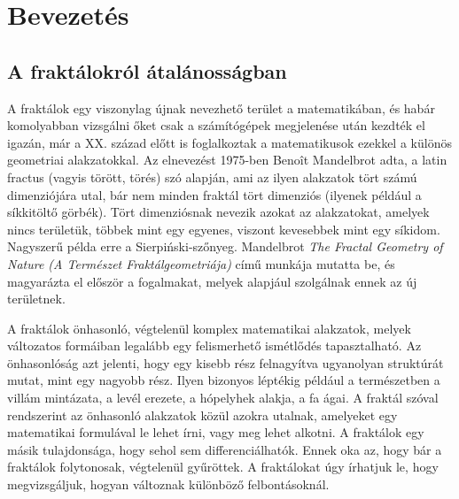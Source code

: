 \chapter*{Bevezetés}
\section*{A fraktálokról átalánosságban}
A fraktálok egy viszonylag újnak nevezhető terület a matematikában, és habár komolyabban vizsgálni őket csak a számítógépek megjelenése után kezdték el igazán, már a XX. század előtt is foglalkoztak a matematikusok ezekkel a különös geometriai alakzatokkal. Az elnevezést 1975-ben Benoît Mandelbrot adta, a latin fractus (vagyis törött, törés) szó alapján, ami az ilyen alakzatok tört számú dimenziójára utal, bár nem minden fraktál tört dimenziós (ilyenek például a síkkitöltő görbék).
Tört dimenziósnak nevezik azokat az alakzatokat, amelyek nincs területük, többek mint egy egyenes, viszont kevesebbek mint egy síkidom. Nagyszerű példa erre a Sierpiński-szőnyeg. Mandelbrot {\it The Fractal Geometry of Nature (A Természet Fraktálgeometriája)} című munkája mutatta be, és magyarázta el először a fogalmakat, melyek alapjául szolgálnak ennek az új területnek.
\par A fraktálok önhasonló, végtelenül komplex matematikai alakzatok, melyek változatos formáiban legalább egy felismerhető ismétlődés tapasztalható. Az önhasonlóság azt jelenti, hogy egy kisebb rész felnagyítva ugyanolyan struktúrát mutat, mint egy nagyobb rész. Ilyen bizonyos léptékig például a természetben a villám mintázata, a levél erezete, a hópelyhek alakja, a fa ágai. A fraktál szóval rendszerint az önhasonló alakzatok közül azokra utalnak, amelyeket egy matematikai formulával le lehet írni, vagy meg lehet alkotni. A fraktálok egy másik tulajdonsága, hogy sehol sem differenciálhatók. Ennek oka az, hogy bár a fraktálok folytonosak, végtelenül gyűröttek. A fraktálokat úgy írhatjuk le, hogy megvizsgáljuk, hogyan változnak különböző felbontásoknál. 
